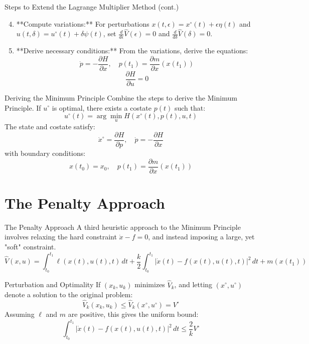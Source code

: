 \documentclass[10pt]{beamer}
\begin{document}
\begin{frame}{Steps to Extend the Lagrange Multiplier Method (cont.)}
\begin{enumerate}
    \setcounter{enumi}{3}
    \item **Compute variations:** For perturbations \( x(t, \epsilon) = x^\circ(t) + \epsilon \eta(t) \) and \( u(t, \delta) = u^\circ(t) + \delta \psi(t) \), set \( \frac{d}{d\epsilon} \hat{V}(\epsilon) = 0 \) and \( \frac{d}{d\delta} \hat{V}(\delta) = 0 \).
    \item **Derive necessary conditions:** From the variations, derive the equations:
    \[
    \dot{p} = -\frac{\partial H}{\partial x}, \quad p(t_1) = \frac{\partial m}{\partial x}(x(t_1))
    \]
    \[
    \frac{\partial H}{\partial u} = 0
    \]
\end{enumerate}
\end{frame}

\begin{frame}{Deriving the Minimum Principle}
  Combine the steps to derive the Minimum Principle. If \( u^\circ \) is optimal, there exists a costate \( p(t) \) such that:
  \[
  u^\circ(t) = \arg \min_u H(x^\circ(t), p(t), u, t)
  \]
  The state and costate satisfy:
  \[
  \dot{x}^\circ = \frac{\partial H}{\partial p}, \quad \dot{p} = -\frac{\partial H}{\partial x}
  \]
  with boundary conditions:
  \[
  x(t_0) = x_0, \quad p(t_1) = \frac{\partial m}{\partial x}(x(t_1))
  \]
\end{frame}
  
\section{The Penalty Approach}
  
\begin{frame}[fragile]{The Penalty Approach}
  A third heuristic approach to the Minimum Principle involves relaxing the hard constraint \( \dot{x} - f = 0 \), and instead imposing a large, yet "soft" constraint.
  \[
  \hat{V}(x, u) = \int_{t_0}^{t_1} \ell(x(t), u(t), t) \, dt + \frac{k}{2} \int_{t_0}^{t_1} |\dot{x}(t) - f(x(t), u(t), t)|^2 \, dt + m(x(t_1))
  \]
  \end{frame}
  
  \begin{frame}[fragile]{Perturbation and Optimality}
  If \( (x_k, u_k) \) minimizes \( \hat{V}_k \), and letting \( (x^\circ, u^\circ) \) denote a solution to the original problem:
  \[
  \hat{V}_k(x_k, u_k) \leq \hat{V}_k(x^\circ, u^\circ) = V^\circ
  \]
  Assuming \( \ell \) and \( m \) are positive, this gives the uniform bound:
  \[
  \int_{t_0}^{t_1} |\dot{x}(t) - f(x(t), u(t), t)|^2 \, dt \leq \frac{2}{k} V^\circ
  \]
\end{frame}
  
\end{document}
